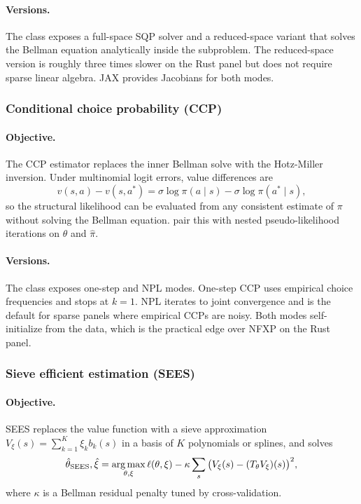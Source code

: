 \paragraph{Versions.} The  class exposes a full-space SQP solver and a reduced-space variant that solves the Bellman equation analytically inside the subproblem. The reduced-space version is roughly three times slower on the Rust panel but does not require sparse linear algebra. JAX provides Jacobians for both modes.

\subsubsection{Conditional choice probability (CCP)}

\paragraph{Objective.} The CCP estimator \citep{hotz1993} replaces the inner Bellman solve with the Hotz-Miller inversion. Under multinomial logit errors, value differences are
\begin{equation}
v(s, a) - v(s, a^\ast) = \sigma \log \pi(a \mid s) - \sigma \log \pi(a^\ast \mid s),
\label{eq:hotz}
\end{equation}
so the structural likelihood can be evaluated from any consistent estimate of $\pi$ without solving the Bellman equation. \citet{aguirregabiria2002} pair this with nested pseudo-likelihood iterations on $\theta$ and $\hat\pi$.

\paragraph{Versions.} The  class exposes one-step and NPL modes. One-step CCP uses empirical choice frequencies and stops at $k = 1$. NPL iterates to joint convergence and is the default for sparse panels where empirical CCPs are noisy. Both modes self-initialize from the data, which is the practical edge over NFXP on the Rust panel.

\subsubsection{Sieve efficient estimation (SEES)}

\paragraph{Objective.} SEES \citep{luo2024sees} replaces the value function with a sieve approximation $V_\xi(s) = \sum_{k=1}^{K} \xi_k b_k(s)$ in a basis of $K$ polynomials or splines, and solves
\begin{equation}
\hat\theta_{\mathrm{SEES}}, \hat\xi = \operatorname*{arg\,max}_{\theta, \xi} \ell(\theta, \xi) - \kappa \sum_s \big( V_\xi(s) - (T_\theta V_\xi)(s) \big)^2,
\label{eq:sees}
\end{equation}
where $\kappa$ is a Bellman residual penalty tuned by cross-validation.

